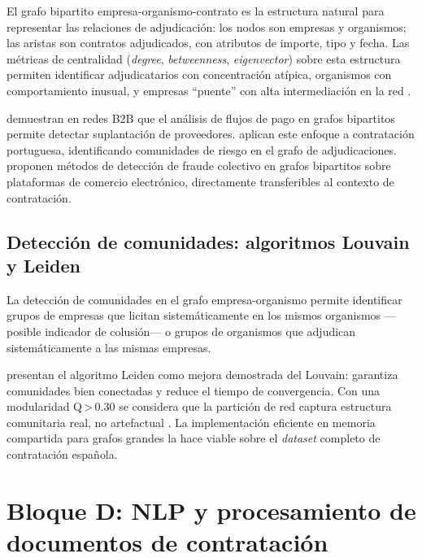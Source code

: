 \documentclass[11pt,a4paper,spanish]{book}
\numberwithin{equation}{chapter}
\numberwithin{figure}{chapter}
\begin{document}
El grafo bipartito empresa-organismo-contrato es la estructura natural para representar las relaciones de adjudicaci{\'o}n: los nodos son empresas y organismos; las aristas son contratos adjudicados, con atributos de importe, tipo y fecha. Las m{\'e}tricas de centralidad (\textit{degree}, \textit{betweenness}, \textit{eigenvector}) sobre esta estructura permiten identificar adjudicatarios con concentraci{\'o}n at{\'i}pica, organismos con comportamiento inusual, y empresas ``puente'' con alta intermediaci{\'o}n en la red \cite{Wachs2025ML}.

 demuestran en redes B2B que el an{\'a}lisis de flujos de pago en grafos bipartitos permite detectar suplantaci{\'o}n de proveedores.  aplican este enfoque a contrataci{\'o}n portuguesa, identificando comunidades de riesgo en el grafo de adjudicaciones.  proponen m{\'e}todos de detecci{\'o}n de fraude colectivo en grafos bipartitos sobre plataformas de comercio electr{\'o}nico, directamente transferibles al contexto de contrataci{\'o}n.

\subsection{Detecci{\'o}n de comunidades: algoritmos Louvain y Leiden}

La detecci{\'o}n de comunidades en el grafo empresa-organismo permite identificar grupos de empresas que licitan sistem{\'a}ticamente en los mismos organismos ---posible indicador de colusi{\'o}n--- o grupos de organismos que adjudican sistem{\'a}ticamente a las mismas empresas.

 presentan el algoritmo Leiden como mejora demostrada del Louvain: garantiza comunidades bien conectadas y reduce el tiempo de convergencia. Con una modularidad Q\,>\,0.30 se considera que la partici{\'o}n de red captura estructura comunitaria real, no artefactual \cite{Traag2019Leiden}. La implementaci{\'o}n eficiente en memoria compartida para grafos grandes \cite{FastLeiden2024} la hace viable sobre el \textit{dataset} completo de contrataci{\'o}n espa{\~n}ola.

\section{Bloque D: NLP y procesamiento de documentos de contrataci{\'o}n}
\end{document}
